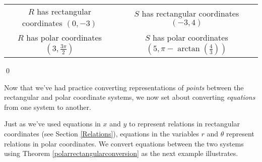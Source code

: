 \documentclass{ximera}
\begin{document}
\begin{example}
\begin{center}
\begin{tabular}{cc}
$R$ has rectangular coordinates $(0,-3)$ & $S$ has rectangular coordinates $(-3,4)$ \\
$R$ has polar coordinates $\left(3,\frac{3\pi}{2}\right)$ & $S$ has polar coordinates $\left(5, \pi - \arctan\left(\frac{4}{3}\right)\right)$  \\

\end{tabular}

\end{center}

\vspace{-.25in} \qed

\end{example}

\medskip

Now that we've had practice converting representations of \textit{points} between the rectangular and polar coordinate systems, we now set about converting \textit{equations} from one system to another.  

\smallskip

Just as we've used equations in $x$ and $y$ to represent relations in rectangular coordinates (see Section \ref{Relations}), equations in the variables $r$ and $\theta$ represent relations in polar coordinates.  We convert equations between the two systems using Theorem \ref{polarrectangularconversion} as the next example illustrates.

\medskip
\end{document}
